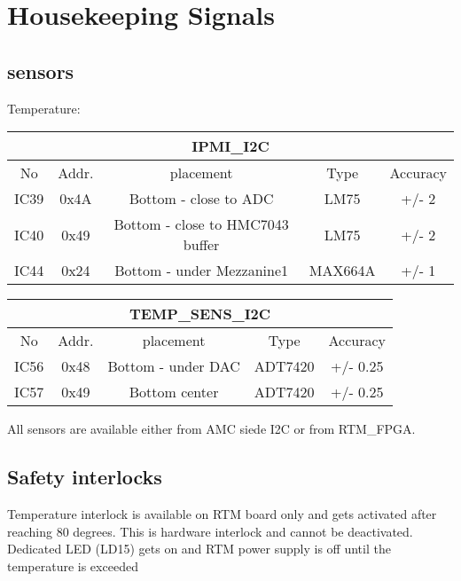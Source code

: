 \section{Housekeeping Signals}

\subsection{sensors}
Temperature:\\

\begin{longtable}{|c|c|c|c|c|}\hline
	\multicolumn{5}{|c|}{IPMI\_I2C}\\ \hline
	No & Addr. & placement & Type & Accuracy \\ \hline
	IC39 & 0x4A & Bottom - close to ADC  & LM75 & +/- 2 \\ \hline
	IC40 & 0x49 & Bottom - close to HMC7043 buffer& LM75 & +/- 2  \\ \hline
	IC44 & 0x24 & Bottom - under Mezzanine1 & MAX664A & +/- 1 \\ \hline
\end{longtable}

\begin{longtable}{|c|c|c|c|c|}\hline
		\multicolumn{5}{|c|}{TEMP\_SENS\_I2C}\\ \hline
	No & Addr. & placement & Type & Accuracy \\ \hline
	IC56 & 0x48 & Bottom - under DAC & ADT7420 & +/- 0.25 \\ \hline
	IC57 & 0x49 & Bottom center & ADT7420 & +/- 0.25  \\ \hline
\end{longtable}

All sensors are available either from AMC siede I2C or from RTM\_FPGA.







\subsection{Safety interlocks}

Temperature interlock is available on RTM board only and gets activated after reaching 80 degrees. This is hardware interlock and cannot be deactivated. Dedicated LED (LD15) gets on and RTM power supply is off until the temperature is exceeded